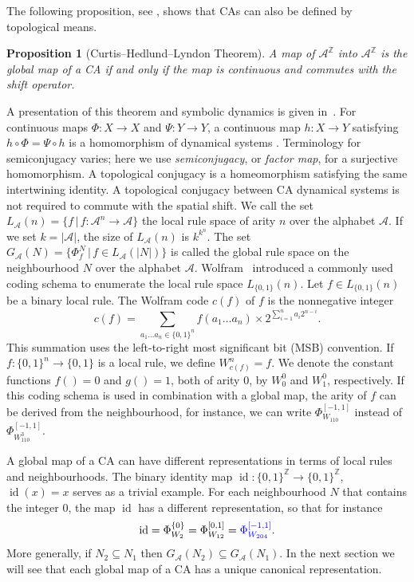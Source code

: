 \documentclass[11pt,a4paper]{article}
\newcommand{\rev}[1]{{\color{blue}#1}}
\newenvironment{revision}{\color{blue}}{}
\newcommand{\rev}[1]{{\color{black}#1}}
\newenvironment{revision}{\color{black}}{}
\newcommand{\locmark}[1]{\label{#1}\linelabel{line:#1}}
\newcommand{\id}{\mathop{\mathrm{id}}}
\newtheorem{prop}{Proposition}
\begin{document}
The following proposition, see \cite{DBLP:journals/mst/Hedlund69}, shows that CAs can also be defined by topological means.
\begin{prop}[\rev{Curtis--Hedlund--Lyndon} Theorem]
A map of $\mathcal{A}^\mathbb{Z}$ into $\mathcal{A}^\mathbb{Z}$ is the global map of a CA if and only if
the map is continuous and commutes with the shift operator.
\end{prop}
\rev{A presentation of this theorem and symbolic dynamics is given
in~\cite{Lind_Marcus_1995}.}
\begin{revision}
\locmark{loc:dynamical-definitions}
For continuous maps $\Phi:X\to X$ and $\Psi:Y\to Y$, a continuous
map $h:X\to Y$ satisfying $h\circ\Phi=\Psi\circ h$ is a
homomorphism of dynamical systems \cite[p.~185]{Lind_Marcus_1995}.
Terminology for semiconjugacy varies; here we use \emph{semiconjugacy},
or \emph{factor map}, for a surjective homomorphism. A topological
conjugacy is a homeomorphism satisfying the same intertwining identity.
A topological conjugacy between CA dynamical systems is not required
to commute with the spatial shift.
\end{revision}
We call the set $L_\mathcal{A}(n) = \{f \, | \, f : \mathcal{A}^n \to \mathcal{A} \}$ the local rule space of
arity $n$ over the alphabet $\mathcal{A}$.
If we set $k = |\mathcal{A}|$, the size of $L_{\mathcal{A}}(n)$ is $k^{k^n}$.
The set $G_\mathcal{A}(N) = \{ \Phi^N_f \, | \, f \in L_\mathcal{A}(|N|) \}$ is called the global rule
space on the neighbourhood $N$ over the alphabet $\mathcal{A}$.
Wolfram~\cite{wolfram-1986} introduced a commonly used coding schema to enumerate the local rule space $L_{\{0,1\}}(n)$.
Let $f \in L_{\{0,1\}}(n)$ be a binary local rule.
The Wolfram code $c(f)$ of $f$ is the nonnegative integer
\[
c(f) = \sum_{a_1\ldots a_{n} \in \{0,1\}^n} f(a_1\ldots a_{n}) \times 2^{\sum_{i=1}^{n} a_i 2^{n-i}}.
\]
This summation uses the left-to-right most significant bit (MSB) convention.
If $f: \{ 0, 1 \}^n \to \{ 0, 1 \} $ is a local rule,
we define $W^n_{c(f)} = f$.
We denote the constant functions $f() = 0$ and $g() = 1$, both of arity 0, by
$W^0_0$ and $W^0_1$, respectively.
If this coding schema is used in combination with a global map, the arity of $f$ can be derived
from the neighbourhood, for instance, we can write
$\Phi^{[-1,1]}_{W_{110}}$ instead of $\Phi^{[-1,1]}_{W^3_{110}}$.

A global map of a CA can have different representations in terms of
local rules and neighbourhoods.
The binary identity map $\id: \{0,1\}^\mathbb{Z} \to \{0,1\}^\mathbb{Z}$,
$\id(x) = x$ serves as a trivial example.
For each neighbourhood $N$ that contains the integer 0,
the map $\id$ has a different representation, so that for instance
\[
\id = \Phi^{\{0\}}_{W_2} = \Phi^{[0,1]}_{W_{12}} = \rev{\Phi^{[-1,1]}_{W_{204}}}.
\]
\rev{More generally, if $N_2 \subseteq N_1$} then $G_\mathcal{A}(N_2) \subseteq G_\mathcal{A}(N_1)$.
\rev{In the next section} we will see that each global map of a CA
has a unique canonical representation.
\end{document}
